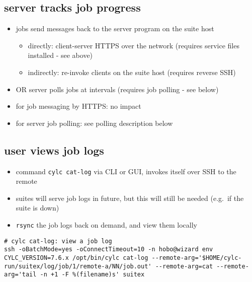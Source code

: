 \documentclass{article}
\begin{document}
\subsection{server tracks job progress}

\begin{itemize}
  \item jobs send messages back to the server program on the suite host
    \begin{itemize}
      \item directly: client-server HTTPS over the network (requires service
        files installed - see above)
      \item indirectly: re-invoke clients on the suite host (requires reverse SSH)
    \end{itemize}
  \item OR server polls jobs at intervals (requires job polling - see below)
\end{itemize}

{\color{blue}{\bf SSH-free?}
\begin{itemize}
  \item for job messaging by HTTPS: no impact
  \item for server job polling: see polling description below
\end{itemize}
}

\subsection{user views job logs}

\begin{itemize}
  \item command \lstinline=cylc cat-log= via CLI or GUI, invokes itself over
    SSH to the remote
  \item suites will serve job logs in future, but this will still be needed
    (e.g.\ if the suite is down)
\end{itemize}

{\color{blue}{\bf SSH-free?}
\begin{itemize}
  \item \lstinline=rsync= the job logs back on demand, and view them locally
\end{itemize}
}

\vspace{5mm}
\begin{lstlisting}
# cylc cat-log: view a job log
ssh -oBatchMode=yes -oConnectTimeout=10 -n hobo@wizard env CYLC_VERSION=7.6.x /opt/bin/cylc cat-log --remote-arg='$HOME/cylc-run/suitex/log/job/1/remote-a/NN/job.out' --remote-arg=cat --remote-arg='tail -n +1 -F %(filename)s' suitex
\end{lstlisting}
\end{document}
